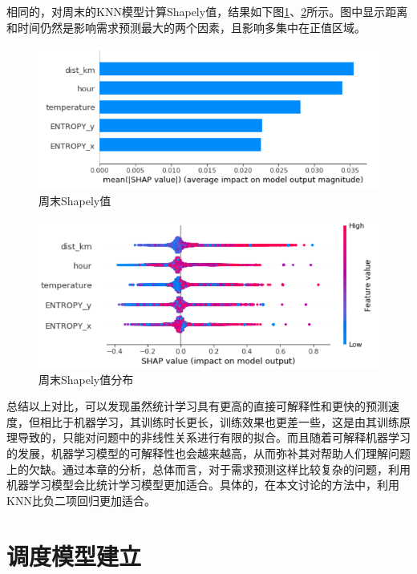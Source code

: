 \documentclass[]{tongjithesis}
\numberwithin{equation}{chapter}
\begin{document}
相同的，对周末的KNN模型计算Shapely值，结果如下图\ref{weekend_shap1}、\ref{weekend_shap2}所示。图中显示距离和时间仍然是影响需求预测最大的两个因素，且影响多集中在正值区域。
\begin{figure}[H]
	\centering
	\includegraphics[width= 0.9 \textwidth]{figures_main/shap_weekend.png}
	\caption{周末Shapely值}
	\label{weekend_shap1}
\end{figure}

\begin{figure}[H]
	\centering
	\includegraphics[width= 0.9 \textwidth]{figures_main/shap1_weekend.png}
	\caption{周末Shapely值分布}
	\label{weekend_shap2}
\end{figure}

总结以上对比，可以发现虽然统计学习具有更高的直接可解释性和更快的预测速度，但相比于机器学习，其训练时长更长，训练效果也更差一些，这是由其训练原理导致的，只能对问题中的非线性关系进行有限的拟合。而且随着可解释机器学习的发展，机器学习模型的可解释性也会越来越高，从而弥补其对帮助人们理解问题上的欠缺。通过本章的分析，总体而言，对于需求预测这样比较复杂的问题，利用机器学习模型会比统计学习模型更加适合。具体的，在本文讨论的方法中，利用KNN比负二项回归更加适合。

\clearpage

\chapter{调度模型建立}
\end{document}
